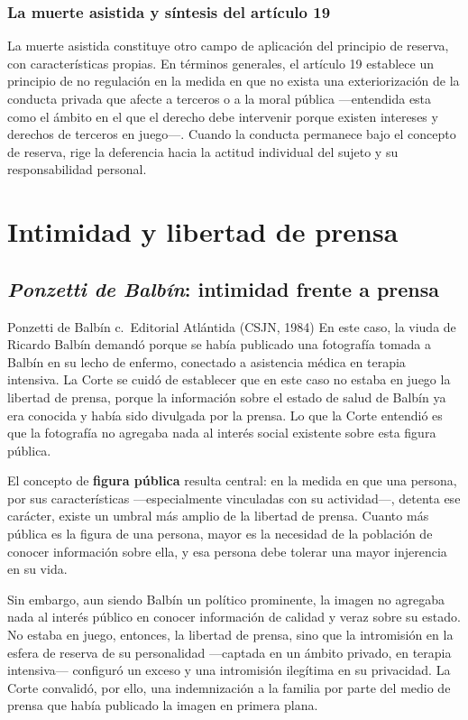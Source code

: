 \documentclass[12pt,oneside]{book}
\begin{document}
\subsection{La muerte asistida y síntesis del artículo 19}

La muerte asistida constituye otro campo de aplicación del principio de reserva, con características propias. En términos generales, el artículo 19 establece un principio de no regulación en la medida en que no exista una exteriorización de la conducta privada que afecte a terceros o a la moral pública —entendida esta como el ámbito en el que el derecho debe intervenir porque existen intereses y derechos de terceros en juego—. Cuando la conducta permanece bajo el concepto de reserva, rige la deferencia hacia la actitud individual del sujeto y su responsabilidad personal.

\chapter{Intimidad y libertad de prensa}

\section{\emph{Ponzetti de Balbín}: intimidad frente a prensa}

\begin{example}{Ponzetti de Balbín c.\ Editorial Atlántida (CSJN, 1984)}
En este caso, la viuda de Ricardo Balbín demandó porque se había publicado una fotografía tomada a Balbín en su lecho de enfermo, conectado a asistencia médica en terapia intensiva. La Corte se cuidó de establecer que en este caso no estaba en juego la libertad de prensa, porque la información sobre el estado de salud de Balbín ya era conocida y había sido divulgada por la prensa. Lo que la Corte entendió es que la fotografía no agregaba nada al interés social existente sobre esta figura pública.

El concepto de \textbf{figura pública} resulta central: en la medida en que una persona, por sus características —especialmente vinculadas con su actividad—, detenta ese carácter, existe un umbral más amplio de la libertad de prensa. Cuanto más pública es la figura de una persona, mayor es la necesidad de la población de conocer información sobre ella, y esa persona debe tolerar una mayor injerencia en su vida.

Sin embargo, aun siendo Balbín un político prominente, la imagen no agregaba nada al interés público en conocer información de calidad y veraz sobre su estado. No estaba en juego, entonces, la libertad de prensa, sino que la intromisión en la esfera de reserva de su personalidad —captada en un ámbito privado, en terapia intensiva— configuró un exceso y una intromisión ilegítima en su privacidad. La Corte convalidó, por ello, una indemnización a la familia por parte del medio de prensa que había publicado la imagen en primera plana.
\end{example}
\end{document}

